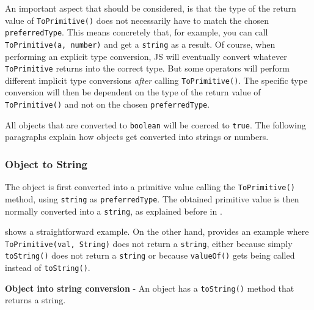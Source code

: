 An important aspect that should be considered, is that the type of the return value of \texttt{ToPrimitive()} does not necessarily have to match the chosen \texttt{preferredType}. This means concretely that, for example, you can call \texttt{ToPrimitive(a, number)} and get a \texttt{string} as a result. Of course, when performing an explicit type conversion, JS will eventually convert whatever \texttt{ToPrimitive} returns into the correct type. But some operators will perform different implicit type conversions \textit{after} calling \texttt{ToPrimitive()}. The specific type conversion will then be dependent on the type of the return value of \texttt{ToPrimitive()} and not on the chosen \texttt{preferredType}.

All objects that are converted to \texttt{boolean} will be coerced to \texttt{true}. The following paragraphs explain how objects get converted into strings or numbers.

\subsubsection{Object to String}
The object is first converted into a primitive value calling the \texttt{ToPrimitive()} method, using \texttt{string} as \texttt{preferredType}. The obtained primitive value is then normally converted into a \texttt{string}, as explained before in .

 shows a straightforward example. On the other hand,  provides an example where \texttt{ToPrimitive(val, String)} does not return a \texttt{string}, either because simply \texttt{toString()} does not return a \texttt{string} or because \texttt{valueOf()} gets being called instead of \texttt{toString()}.

\begin{code}
	\captionsetup{aboveskip=0pt, belowskip=10pt}
	\caption[Object into string conversion]{\textbf{Object into string conversion} - An object has a \texttt{toString()} method that returns a string.}
	\label{code:background-object-into-string}
\end{code}

